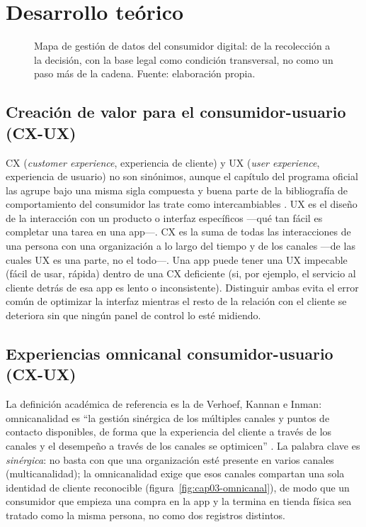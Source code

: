 \section{Desarrollo teórico}

\begin{figure}[htbp]
  \centering
  \resizebox{\textwidth}{!}{}
  \caption{Mapa de gestión de datos del consumidor digital: de la
  recolección a la decisión, con la base legal como condición transversal, no
  como un paso más de la cadena. Fuente: elaboración propia.}
  \label{fig:cap03-mapa}
\end{figure}

\subsection{Creación de valor para el consumidor-usuario (CX-UX)}

CX (\textit{customer experience}, experiencia de cliente) y UX
(\textit{user experience}, experiencia de usuario) no son sinónimos, aunque
el capítulo del programa oficial las agrupe bajo una misma sigla compuesta y
buena parte de la bibliografía de comportamiento del consumidor las trate
como intercambiables \parencite{hoyer2024consumer}.
UX es el diseño de la interacción con un producto o interfaz específicos
—qué tan fácil es completar una tarea en una app—. CX es la suma de todas
las interacciones de una persona con una organización a lo largo del tiempo
y de los canales —de las cuales UX es una parte, no el todo—. Una app puede
tener una UX impecable (fácil de usar, rápida) dentro de una CX deficiente
(si, por ejemplo, el servicio al cliente detrás de esa app es lento o
inconsistente). Distinguir ambas evita el error común de optimizar la
interfaz mientras el resto de la relación con el cliente se deteriora sin
que ningún panel de control lo esté midiendo.

\subsection{Experiencias omnicanal consumidor-usuario (CX-UX)}

La definición académica de referencia es la de Verhoef, Kannan e Inman:
omnicanalidad es \enquote{la gestión sinérgica de los múltiples canales y
puntos de contacto disponibles, de forma que la experiencia del cliente a
través de los canales y el desempeño a través de los canales se optimicen}
\parencite{verhoef2015}. La palabra clave es \textit{sinérgica}: no basta con
que una organización esté presente en varios canales (multicanalidad); la
omnicanalidad exige que esos canales compartan una sola identidad de cliente
reconocible (figura~\ref{fig:cap03-omnicanal}), de modo que un consumidor que
empieza una compra en la app y la termina en tienda física sea tratado como
la misma persona, no como dos registros distintos.

